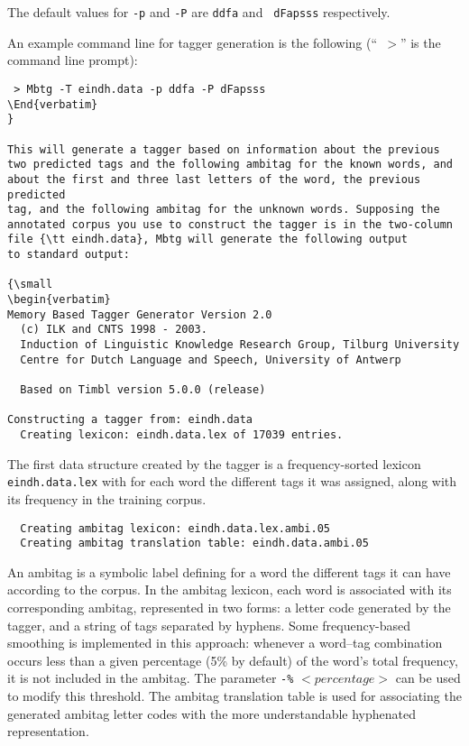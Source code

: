 \documentclass{report}
\begin{document}
The default values for {\tt -p} and {\tt -P} are {\tt ddfa} and {\tt
  dFapsss} respectively. 

An example command line for tagger generation is the following (``{\tt
$>$}'' is the command line prompt):

{\small
\begin{verbatim}
 > Mbtg -T eindh.data -p ddfa -P dFapsss
\End{verbatim}
}

This will generate a tagger based on information about the previous
two predicted tags and the following ambitag for the known words, and
about the first and three last letters of the word, the previous predicted
tag, and the following ambitag for the unknown words. Supposing the
annotated corpus you use to construct the tagger is in the two-column
file {\tt eindh.data}, Mbtg will generate the following output
to standard output:

{\small
\begin{verbatim}
Memory Based Tagger Generator Version 2.0
  (c) ILK and CNTS 1998 - 2003.
  Induction of Linguistic Knowledge Research Group, Tilburg University
  Centre for Dutch Language and Speech, University of Antwerp

  Based on Timbl version 5.0.0 (release)

Constructing a tagger from: eindh.data
  Creating lexicon: eindh.data.lex of 17039 entries.
\end{verbatim}
}

The first data structure created by the tagger is a frequency-sorted
lexicon {\tt eindh.data.lex} with for each word the different tags it
was assigned, along with its frequency in the training corpus. 

{\small
\begin{verbatim}
  Creating ambitag lexicon: eindh.data.lex.ambi.05
  Creating ambitag translation table: eindh.data.ambi.05
\end{verbatim}
}

An ambitag is a symbolic label defining for a word the different
tags it can have according to the corpus.  In the ambitag lexicon,
each word is associated with its corresponding ambitag, represented in
two forms: a letter code generated by the tagger, and a string of tags
separated by hyphens. Some frequency-based smoothing is implemented in
this approach: whenever a word--tag combination occurs less than a
given percentage (5\% by default) of the word's total frequency, it is
not included in the ambitag. The parameter {\tt -\%} $<percentage>$ can be
used to modify this threshold. The ambitag translation table is used
for associating the generated ambitag letter codes with the more
understandable hyphenated representation.
\end{document}
